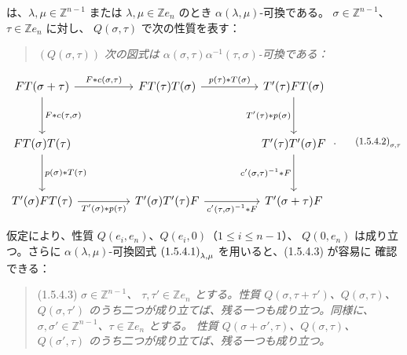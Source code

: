 \clearpage
{}%
は、$\lambda,\mu\in\mathbb Z^{n-1}$ または
$\lambda,\mu\in\mathbb Z e_n$ のとき $\alpha(\lambda,\mu)$-可換である。
$\sigma\in\mathbb Z^{n-1}$、$\tau\in\mathbb Z e_n$ に対し、
$Q(\sigma,\tau)$ で次の性質を表す：

\begin{quote}
  \noindent\textup{$(Q(\sigma,\tau))$}\quad
  \emph{次の図式は
  $\alpha(\sigma,\tau)\alpha^{-1}(\tau,\sigma)$-可換である：}
\end{quote}

\begin{equation}
  \resizebox{0.98\textwidth}{!}{%
    $\begin{tikzcd}[ampersand replacement=\&,column sep=4.5em,row sep=3.2em]
      FT(\sigma+\tau)
        \arrow[r,"{F*c(\sigma,\tau)}"]
        \arrow[d,"{F*c(\tau,\sigma)}"]
        \& FT(\tau)T(\sigma)
        \arrow[r,"{p(\tau)*T(\sigma)}"]
        \& T'(\tau)FT(\sigma)
        \arrow[d,"{T'(\tau)*p(\sigma)}"'] \\
      FT(\sigma)T(\tau)
        \arrow[d,"{p(\sigma)*T(\tau)}"]
        \& {}
        \& T'(\tau)T'(\sigma)F
        \arrow[d,"{c'(\sigma,\tau)^{-1}*F}"'] \\
      T'(\sigma)FT(\tau)
        \arrow[r,"{T'(\sigma)*p(\tau)}"']
        \& T'(\sigma)T'(\tau)F
        \arrow[r,"{c'(\tau,\sigma)^{-1}*F}"']
        \& T'(\sigma+\tau)F
    \end{tikzcd}$%
  }\;.
  \tag*{\(\textup{(1.5.4.2)}_{\sigma,\tau}\)}
\end{equation}

仮定により、性質 $Q(e_i,e_n)$、$Q(e_i,0)$（$1\leq i\leq n-1$）、
$Q(0,e_n)$ は成り立つ。さらに
$\alpha(\lambda,\mu)$-可換図式
$\textup{(1.5.4.1)}_{\lambda,\mu}$ を用いると、(1.5.4.3) が容易に
確認できる：

\begin{quote}
  \noindent\textup{(1.5.4.3)}\quad
  \emph{$\sigma\in\mathbb Z^{n-1}$、
  $\tau,\tau'\in\mathbb Z e_n$ とする。性質
  $Q(\sigma,\tau+\tau')$、$Q(\sigma,\tau)$、$Q(\sigma,\tau')$
  のうち二つが成り立てば、残る一つも成り立つ。同様に、
  $\sigma,\sigma'\in\mathbb Z^{n-1}$、$\tau\in\mathbb Z e_n$ とする。
  性質 $Q(\sigma+\sigma',\tau)$、$Q(\sigma,\tau)$、
  $Q(\sigma',\tau)$ のうち二つが成り立てば、残る一つも成り立つ。}
\end{quote}

